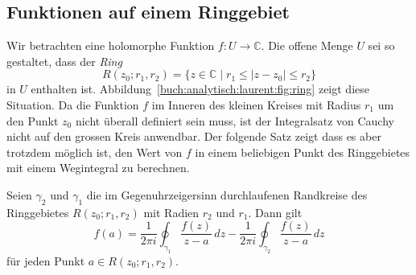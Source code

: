 %
%
%
\subsection{Funktionen auf einem Ringgebiet}
%
Wir betrachten eine holomorphe Funktion $f\colon U\to\mathbb{C}$.
Die offene Menge $U$ sei so gestaltet, dass der \emph{Ring}
\[
R(z_0;r_1,r_2)
=
\{
z\in\mathbb{C}
\mid
r_1 \le |z-z_0| \le r_2
\}
\]
in $U$ enthalten ist.
%
Abbildung~\ref{buch:analytisch:laurent:fig:ring} zeigt diese Situation.
Da die Funktion $f$ im Inneren des kleinen Kreises mit Radius $r_1$ um
den Punkt $z_0$ nicht überall definiert sein muss, ist der Integralsatz
von Cauchy nicht auf den grossen Kreis anwendbar.
Der folgende Satz zeigt dass es aber trotzdem möglich ist, den Wert von
$f$ in einem beliebigen Punkt des Ringgebietes mit einem Wegintegral
zu berechnen.

\begin{satz}
Seien $\gamma_2$ und $\gamma_1$ die im Gegenuhrzeigersinn durchlaufenen
Randkreise des Ringgebietes $R(z_0;r_1,r_2)$ mit Radien $r_2$ und $r_1$.
Dann gilt
\begin{equation}
f(a)
=
\frac{1}{2\pi i}
\oint_{\gamma_1}
\frac{f(z)}{z-a}
\,dz
-
\frac{1}{2\pi i}
\oint_{\gamma_2}
\frac{f(z)}{z-a}
\,dz
\label{buch:analytisch:laurent:eqn:zweiintegrale}
\end{equation}
für jeden Punkt $a\in R(z_0;r_1,r_2)$.
\end{satz}

